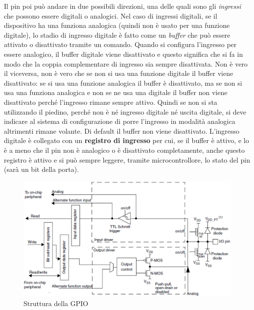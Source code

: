 \documentclass[12pt, a4paper]{report}
\begin{document}
Il pin poi può andare in due possibili direzioni, una delle quali sono gli \textit{ingressi} che possono essere digitali o analogici. Nel caso di ingressi digitali, se il dispositivo ha una funziona analogica (quindi non è usato per una funzione digitale), lo stadio di ingresso digitale è fatto come un \textit{buffer} che può essere attivato o disattivato tramite un comando. Quando si configura l'ingresso per essere analogico, il buffer digitale viene disattivato e questo significa che si fa in modo che la coppia complementare di ingresso sia sempre disattivata. Non è vero il viceversa, non è vero che se non si usa una funzione digitale il buffer viene disattivato: se si usa una funzione analogica il buffer è disattivato, ma se non si usa una funziona analogica e non se ne usa una digitale il buffer non viene disattivato perché l'ingresso rimane sempre attivo. Quindi se non si sta utilizzando il piedino, perché non è né ingresso digitale né uscita digitale, si deve indicare al sistema di configurazione di porre l'ingresso in modalità analogica altrimenti rimane volante. Di default il buffer non viene disattivato. L'ingresso digitale è collegato con un \textbf{registro di ingresso} per cui, se il buffer è attivo, e lo è a meno che il pin non è analogico o è disattivato completamente, anche questo registro è attivo e si può sempre leggere, tramite microcontrollore, lo stato del pin (sarà un bit della porta).
\begin{figure}[h]
    \centering
    \includegraphics[scale=0.4,angle=0]{gpio.png}
    \caption{Struttura della GPIO}
\end{figure}
\end{document}
